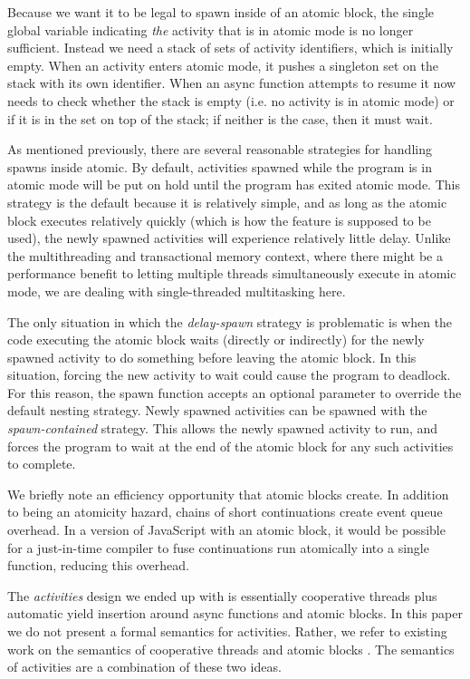 \documentclass[acmsmall,anonymous,review]{acmart}\settopmatter{printfolios=true,printccs=false,printacmref=false}
\begin{document}
Because we want it to be legal to spawn inside of an atomic block, the single global variable indicating \emph{the} activity that is in atomic mode is no longer sufficient.
Instead we need a stack of sets of activity identifiers, which is initially empty.
When an activity enters atomic mode, it pushes a singleton set on the stack with its own identifier.
When an async function attempts to resume it now needs to check whether the stack is empty (i.e. no activity is in atomic mode) or if it is in the set on top of the stack; if neither is the case, then it must wait.

As mentioned previously, there are several reasonable strategies for handling spawns inside atomic.
By default, activities spawned while the program is in atomic mode will be put on hold until the program has exited atomic mode.
This strategy is the default because it is relatively simple, and as long as the atomic block executes relatively quickly (which is how the feature is supposed to be used), the newly spawned activities will experience relatively little delay.
Unlike the multithreading and transactional memory context, where there might be a performance benefit to letting multiple threads simultaneously execute in atomic mode, we are dealing with single-threaded multitasking here.

The only situation in which the \emph{delay-spawn} strategy is problematic is when the code executing the atomic block waits (directly or indirectly) for the newly spawned activity to do something before leaving the atomic block.
In this situation, forcing the new activity to wait could cause the program to deadlock.
For this reason, the spawn function accepts an optional parameter to override the default nesting strategy.
Newly spawned activities can be spawned with the \emph{spawn-contained} strategy.
This allows the newly spawned activity to run, and forces the program to wait at the end of the atomic block for any such activities to complete.

We briefly note an efficiency opportunity that atomic blocks create.
In addition to being an atomicity hazard, chains of short continuations create event queue overhead.
In a version of JavaScript with an atomic block, it would be possible for a just-in-time compiler to fuse continuations run atomically into a single function, reducing this overhead.

The \emph{activities} design we ended up with is essentially cooperative threads plus automatic yield insertion around async functions and atomic blocks.
In this paper we do not present a formal semantics for activities.
Rather, we refer to existing work on the semantics of cooperative threads \cite{Abadi2009} and atomic blocks \cite{Moore2008}.
The semantics of activities are a combination of these two ideas.
\end{document}
